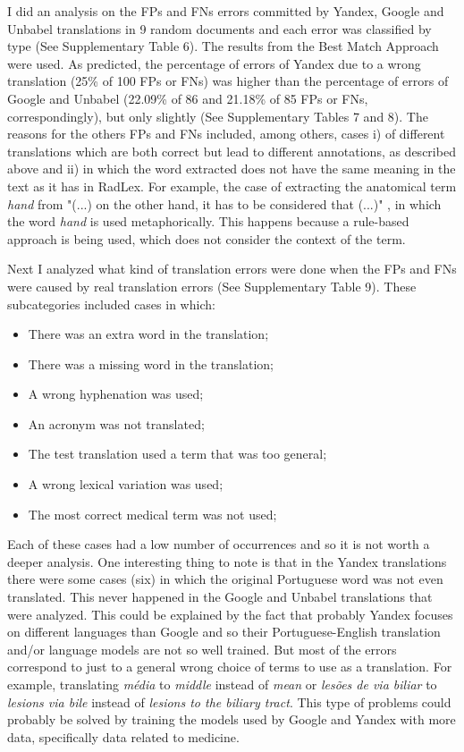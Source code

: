 I did an analysis on the FPs and FNs errors committed by Yandex, Google and Unbabel translations in 9 random documents and each error was classified by type (See Supplementary Table 6). The results from the Best Match Approach were used. As predicted, the percentage of errors of Yandex due to a wrong translation (25\% of 100 FPs or FNs) was higher than the percentage of errors of Google and Unbabel (22.09\% of 86 and 21.18\% of 85 FPs or FNs, correspondingly), but only slightly (See Supplementary Tables 7 and 8). The reasons for the others FPs and FNs included, among others, cases i) of different translations which are both correct but lead to different annotations, as described above and ii) in which the word extracted does not have the same meaning in the text as it has in RadLex. For example, the case of extracting the anatomical term \textit{hand} from "(...) on the other hand, it has to be considered that (...)" , in which the word \textit{hand} is used metaphorically. This happens because a rule-based approach is being used, which does not consider the context of the term. 

Next I analyzed what kind of translation errors were done when the FPs and FNs were caused by real translation errors (See Supplementary Table 9). These subcategories included cases in which:

\begin{itemize}
	\item There was an extra word in the translation;
	\item There was a missing word in the translation;
	\item A wrong hyphenation was used;
	\item An acronym was not translated; 
	\item The test translation used a term that was too general;
	\item A wrong lexical variation was used;
	\item The most correct medical term was not used;
\end{itemize}

Each of these cases had a low number of occurrences and so it is not worth a deeper analysis. One interesting thing to note is that in the Yandex translations there were some cases (six) in which the original Portuguese word was not even translated. This never happened in the Google and Unbabel translations that were analyzed. This could be explained by the fact that probably Yandex focuses on different languages than Google and so their Portuguese-English translation and/or language models are not so well trained. But most of the errors correspond to just to a general wrong choice of terms to use as a translation. For example, translating \textit{média} to \textit{middle} instead of \textit{mean} or \textit{lesões de via biliar} to \textit{lesions via bile} instead of \textit{lesions to the biliary tract}. This type of problems could probably be solved by training the models used by Google and Yandex with more data, specifically data related to medicine.

